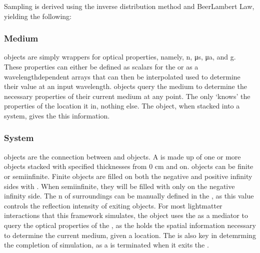 \documentclass[letterpaper,10pt,english]{sphinxmanual}
\begin{document}
\sphinxAtStartPar
Sampling is derived using the inverse distribution method and Beer\sphinxhyphen{}Lambert Law, yielding the following:




\subsubsection{Medium}
\label{\detokenize{README:medium}}
\sphinxAtStartPar
{} objects are simply wrappers for optical properties, namely, n, μs, μa, and g.
These properties can either be defined as scalars for the  or as a wavelength\sphinxhyphen{}dependent arrays that can then be
interpolated used to determine their value at an input wavelength.  objects query the medium to determine the
necessary properties of their current medium at any point. The  only ‘knows’ the properties of the location it
in, nothing else. The  object, when stacked into a system, gives the  this information.


\subsubsection{System}
\label{\detokenize{README:system}}
\sphinxAtStartPar
{} objects are the connection between  and  objects. A  is made up of one or more 
objects stacked with specified thicknesses from 0 cm and on.  objects can be finite or semi\sphinxhyphen{}infinite. Finite
 objects are filled on both the negative and positive infinity sides with . When semi\sphinxhyphen{}infinite,
they will be filled with  only on the negative infinity side. The n of surroundings can be manually
defined in the , as this value controls the reflection intensity of exiting  objects. For most
light\sphinxhyphen{}matter interactions that this framework simulates, the  object uses the  as a mediator to query
the optical properties of the , as the  holds the spatial information necessary to determine the current
medium, given a location. The  is also key in detemrming the completion of simulation, as a  is
terminated when it exits the .
\end{document}
